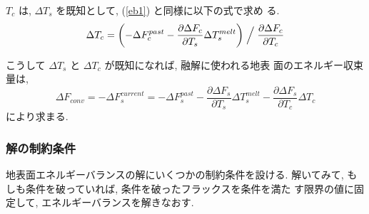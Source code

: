 $T_c$ は, $\Delta T_s$ を既知として, (\ref{eb1}) と同様に以下の式で求め
る.
\begin{equation}
 \Delta T_c = \left( - \Delta F_c^{past}
            - \frac{\partial \Delta F_c}{\partial T_s} \Delta T_s^{melt}
              \right) \Bigm/ \frac{\partial \Delta F_c}{\partial T_c}
\end{equation}

こうして $\Delta T_s$ と $\Delta T_c$ が既知になれば, 融解に使われる地表
面のエネルギー収束量は,
\begin{equation}
 \Delta F_{conv} =
 - \Delta F_s^{current} = - \Delta F_s^{past}
 - \frac{\partial \Delta F_s}{\partial T_s} \Delta T_s^{melt}
 - \frac{\partial \Delta F_s}{\partial T_c} \Delta T_c
\end{equation}
により求まる.

\subsubsection{解の制約条件}

地表面エネルギーバランスの解にいくつかの制約条件を設ける.
解いてみて, もしも条件を破っていれば, 条件を破ったフラックスを条件を満た
す限界の値に固定して, エネルギーバランスを解きなおす.

